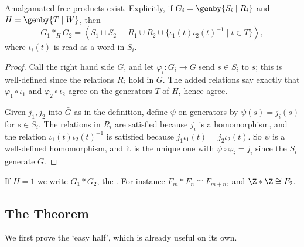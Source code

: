 \begin{proposition} \label{prop:afp-exists}
	Amalgamated free products exist. Explicitly, if $G_i = \genby{S_i \mid R_i}$ and $H = \genby{T \mid W}$, then
	$$
	G_1 *_H G_2 = \left\langle S_1 \sqcup S_2 \;\middle|\; R_1 \cup R_2 \cup \{\iota_1(t)\iota_2(t)^{-1} \mid t \in T\}\right\rangle,
	$$
	where $\iota_i(t)$ is read as a word in $S_i$.
\end{proposition}
\begin{proof}
	Call the right hand side $G$, and let $\varphi_i: G_i \to G$ send $s \in S_i$ to $s$; this is well-defined since the relations $R_i$ hold in $G$. The added relations say exactly that $\varphi_1 \circ\iota_1$ and $\varphi_2\circ\iota_2$ agree on the generators $T$ of $H$, hence agree.

	Given $j_1, j_2$ into $\bar G$ as in the definition, define $\psi$ on generators by $\psi(s) = j_i(s)$ for $s \in S_i$. The relations in $R_i$ are satisfied because $j_i$ is a homomorphism, and the relation $\iota_1(t)\iota_2(t)^{-1}$ is satisfied because $j_1\iota_1(t) = j_2\iota_2(t)$. So $\psi$ is a well-defined homomorphism, and it is the unique one with $\psi\circ\varphi_i = j_i$ since the $S_i$ generate $G$.
\end{proof}

\begin{example}
	If $H = 1$ we write $G_1 * G_2$, the . For instance $F_m * F_n \cong F_{m+n}$, and $\Z * \Z \cong F_2$.
\end{example}

\subsection{The Theorem}

We first prove the `easy half', which is already useful on its own.

